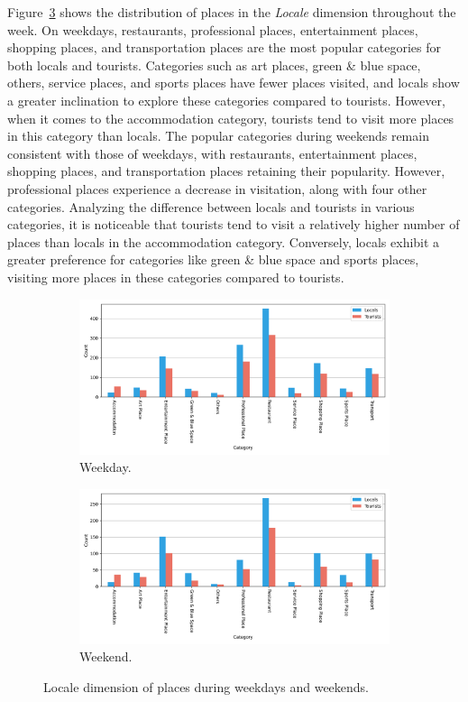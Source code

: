 \documentclass{article}
\theoremstyle{definition}
\theoremstyle{remark}
\begin{document}
Figure~\ref{fig:places_locale_week} shows the distribution of places in the \textit{Locale} dimension throughout the week. On weekdays, restaurants, professional places, entertainment places, shopping places, and transportation places are the most popular categories for both locals and tourists. Categories such as art places, green \& blue space, others, service places, and sports places have fewer places visited, and locals show a greater inclination to explore these categories compared to tourists. However, when it comes to the accommodation category, tourists tend to visit more places in this category than locals. The popular categories during weekends remain consistent with those of weekdays, with restaurants, entertainment places, shopping places, and transportation places retaining their popularity. However, professional places experience a decrease in visitation, along with four other categories. Analyzing the difference between locals and tourists in various categories, it is noticeable that tourists tend to visit a relatively higher number of places than locals in the accommodation category. Conversely, locals exhibit a greater preference for categories like green \& blue space and sports places, visiting more places in these categories compared to tourists.


\begin{figure}[!h]

\centering
\begin{subfigure}{0.6\textheight}
\centering
\includegraphics[width=0.9\linewidth]{figures/places_locale_weekday.png}
\caption{Weekday.}
\label{fig:places_locale_weekday}
\end{subfigure}
\begin{subfigure}{0.6\textheight}
\centering
\includegraphics[width=0.9\linewidth]{figures/places_locale_weekend.png}
\caption{Weekend.}
\label{fig:places_locale_weekend}
\end{subfigure}

\caption{Locale dimension of places during weekdays and weekends.}
\label{fig:places_locale_week}
\end{figure}
\end{document}

